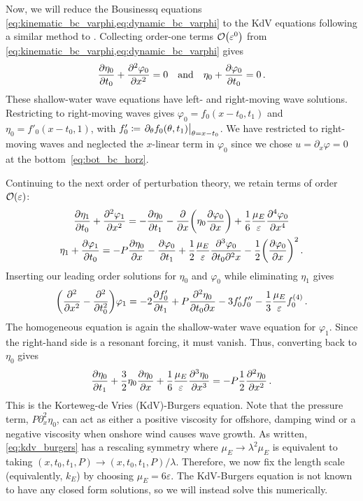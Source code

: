 \documentclass{jfm}
\renewcommand*{\epsilon}{\varepsilon}
\begin{document}
Now, we will reduce the Bousinessq equations
\cref{eq:kinematic_bc_varphi,eq:dynamic_bc_varphi} to the KdV equations
following a similar method to \citet{mei2005nonlinear}.
Collecting order-one terms $\order{\epsilon^0}$ from
\cref{eq:kinematic_bc_varphi,eq:dynamic_bc_varphi} gives
\begin{equation}
  \pdv{\eta_0}{t_0} + \pdv[2]{\varphi_0}{x} = 0 \qq{and}
  \eta_0 + \pdv{\varphi_0}{t_0} = 0 \,.
\end{equation}
These shallow-water wave equations have left- and right-moving wave
solutions.
Restricting to right-moving waves gives $\varphi_0 = f_0(x-t_0,t_1)$ and
$\eta_0 = f'_0(x-t_0,1)$, with $f_0' \coloneqq \eval{\partial_{\theta}
f_0(\theta,t_1)}_{\theta = x-t_0}$.
We have restricted to right-moving waves and neglected the $x$-linear
term in $\varphi_0$ since we chose $u = \partial_x \varphi = 0$ at the
bottom~\cref{eq:bot_bc_horz}.

Continuing to the next order of perturbation theory, we retain terms of
order $\order{\epsilon}$:
\begin{gather}
    \pdv{\eta_1}{t_0} + \pdv[2]{\varphi_{1}}{x} =
      -\pdv{\eta_0}{t_1} - \pdv{x} \pqty{\eta_0 \pdv{\varphi_0}{x}} +
      \frac{1}{6} \frac{\mu_E}{\epsilon} \pdv[4]{\varphi_0}{x}
  \\
    \eta_1 + \pdv{\varphi_1}{t_0} = -P \pdv{\eta_0}{x} -\pdv{\varphi_0}{t_1}
      + \frac{1}{2} \frac{\mu_E}{\epsilon} \frac{\partial^3 \varphi_0}
        {\partial t_0 \partial^2 x}
      - \frac{1}{2} \pqty{ \pdv{\varphi_0}{x} }^2
  \,.
\end{gather}
Inserting our leading order solutions for $\eta_0$ and $\varphi_0$ while
eliminating $\eta_1$ gives
\begin{equation}
  \pqty{\pdv[2]{x} - \pdv[2]{t_0}} \varphi_1 = -2 \pdv{f_0'}{t_1} +
    P\pdv{\eta_0}{t_0}{x} - 3 f_0' f_0'' - \frac{1}{3} \frac{\mu_E}{\epsilon}
    f_0^{(4)} \,.
\end{equation}
The homogeneous equation is again the shallow-water wave equation for
$\varphi_1$.
Since the right-hand side is a resonant forcing, it must vanish.
Thus, converting back to $\eta_0$ gives
\begin{equation}
  \pdv{\eta_0}{t_1} + \frac{3}{2}
    \eta_0 \pdv{\eta_0}{x} + \frac{1}{6} \frac{\mu_E}{\epsilon}
    \pdv[3]{\eta_0}{x} = -P \frac{1}{2} \pdv[2]{\eta_0}{x} \,.
  \label{eq:kdv_burgers}
\end{equation}
This is the Korteweg-de Vries (KdV)-Burgers equation.
Note that the pressure term, $P \partial^2_x \eta_0$, can act as either
a positive viscosity for offshore, damping wind or a negative viscosity
when onshore wind causes wave growth.
As written, \cref{eq:kdv_burgers} has a rescaling symmetry where $\mu_E
\to \lambda^2 \mu_E$ is equivalent to taking $(x,t_0,t_1,P) \to
(x,t_0,t_1,P)/\lambda$.
Therefore, we now fix the length scale (equivalently, $k_E$) by choosing
$\mu_E = 6 \epsilon$.
The KdV-Burgers equation is not known to have any closed form solutions,
so we will instead solve this numerically.
\end{document}
